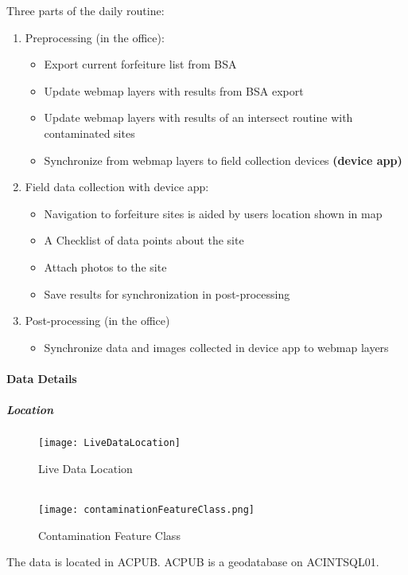 \documentclass[class=article , crop=false, titlepage, twoside, multi={itemize, figure, verbatim}, float=false]{standalone}
\begin{document}
Three parts of the daily routine:
\begin{enumerate}
\item \Large Preprocessing \normalsize(in the office):

\begin{itemize}
\item Export current forfeiture list from BSA
\item Update webmap layers with results from BSA export
\item Update webmap layers with results of an intersect routine with contaminated sites  
\item Synchronize from webmap layers to field collection devices \textbf{(device app)}
\end{itemize}

\item \Large Field data collection \normalsize with device app:

\begin{itemize}
\item Navigation to forfeiture sites is aided by users location shown in map
\item A Checklist of data points about the site
\item Attach photos to the site
\item Save results for synchronization in post-processing
\end{itemize}

\item \Large Post-processing \normalsize (in the office)

\begin{itemize}
\item Synchronize data and images collected in device app to webmap layers

\end{itemize}
\end{enumerate}

\clearpage
\paragraph{Data Details}
\subparagraph*{Location}

\begin{wrapfigure}{r}{0.5\textwidth}
\centering
\texttt{[image: LiveDataLocation]}
\caption{Live Data Location}
\vspace{.25in}
\HRule \\[.4cm] %
\vspace{.25in}
\texttt{[image: contaminationFeatureClass.png]}
\caption{Contamination Feature Class}
\end{wrapfigure}
The data is located in ACPUB.  ACPUB is a geodatabase on ACINTSQL01.
\vspace{.5in}
\end{document}
